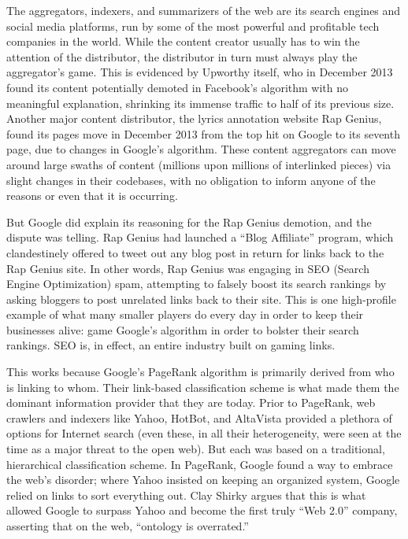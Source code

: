 The aggregators, indexers, and summarizers of the web are its search engines and social media platforms, run by some of the most powerful and profitable tech companies in the world. While the content creator usually has to win the attention of the distributor, the distributor in turn must always play the aggregator's game. This is evidenced by Upworthy itself, who in December 2013 found its content potentially demoted in Facebook's algorithm with no meaningful explanation, shrinking its immense traffic to half of its previous size.\autocite{carlson_upworthy_2014} Another major content distributor, the lyrics annotation website Rap Genius, found its pages move in December 2013 from the top hit on Google to its seventh page, due to changes in Google's algorithm.\autocite{constine_google_2013} These content aggregators can move around large swaths of content (millions upon millions of interlinked pieces) via slight changes in their codebases, with no obligation to inform anyone of the reasons or even that it is occurring.

But Google did explain its reasoning for the Rap Genius demotion, and the dispute was telling. Rap Genius had launched a ``Blog Affiliate'' program, which clandestinely offered to tweet out any blog post in return for links back to the Rap Genius site. In other words, Rap Genius was engaging in SEO (Search Engine Optimization) spam, attempting to falsely boost its search rankings by asking bloggers to post unrelated links back to their site. This is one high-profile example of what many smaller players do every day in order to keep their businesses alive: game Google's algorithm in order to bolster their search rankings. SEO is, in effect, an entire industry built on gaming links.

This works because Google's PageRank algorithm is primarily derived from who is linking to whom. Their link-based classification scheme is what made them the dominant information provider that they are today. Prior to PageRank, web crawlers and indexers like Yahoo, HotBot, and AltaVista provided a plethora of options for Internet search (even these, in all their heterogeneity, were seen at the time as a major threat to the open web). But each was based on a traditional, hierarchical classification scheme. In PageRank, Google found a way to embrace the web's disorder; where Yahoo insisted on keeping an organized system, Google relied on links to sort everything out. Clay Shirky argues that this is what allowed Google to surpass Yahoo and become the first truly ``Web 2.0'' company, asserting that on the web, ``ontology is overrated.''\autocite{shirky_ontology_2005}

